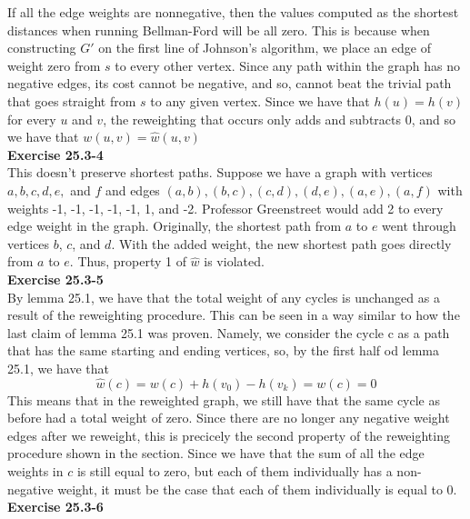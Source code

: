 \documentclass{article}
\begin{document}
If all the edge weights are nonnegative, then the values computed as the shortest distances when running Bellman-Ford will be all zero. This is because when constructing $G'$ on the first line of Johnson's algorithm, we place an edge of weight zero from $s$ to every other vertex. Since any path within the graph has no negative edges, its cost cannot be negative, and so, cannot beat the trivial path that goes straight from $s$ to any given vertex. Since we have that $h(u) = h(v)$ for every $u$ and $v$, the reweighting that occurs only adds and subtracts 0, and so we have that $w(u,v) = \hat w(u,v)$\\

\noindent\textbf{Exercise 25.3-4}\\

This doesn't preserve shortest paths.  Suppose we have a graph with vertices $a, b, c, d, e,$ and $f$ and edges $(a,b), (b,c), (c,d), (d,e), (a,e), (a,f)$ with weights -1, -1, -1, -1, -1, 1, and -2.  Professor Greenstreet would add 2 to every edge weight in the graph.  Originally, the shortest path from $a$ to $e$ went through vertices $b$, $c$, and $d$.  With the added weight, the new shortest path goes directly from $a$ to $e$.  Thus, property 1 of $\hat{w}$ is violated.\\

\noindent\textbf{Exercise 25.3-5}\\

By lemma 25.1, we have that the total weight of any cycles is unchanged as a result of the reweighting procedure. This can be seen in a way similar to how the last claim of lemma 25.1 was proven. Namely, we consider the cycle c as a path that has the same starting and ending vertices, so, by the first half od lemma 25.1, we have that
\[
\hat w(c) = w(c) + h(v_0) -h(v_k) = w(c) = 0
 \]
This means that in the reweighted graph, we still have that the same cycle as before had a total weight of zero. Since there are no longer any negative weight edges after we reweight, this is precicely the second property of the reweighting procedure shown in the section. Since we have that the sum of all the edge weights in $c$ is still equal to zero, but each of them individually has a non-negative weight, it must be the case that each of them individually is equal to 0.\\

\noindent\textbf{Exercise 25.3-6}\\
\end{document}

